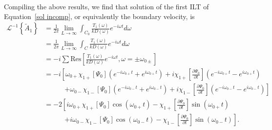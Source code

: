 \documentclass{aastex61}
\begin{document}
Compiling the above results, we find that solution of the first ILT of Equation~\eqref{sol incomp}, or equivalently the boundary velocity, is
\begin{align}
\mathcal{L}^{-1}\left\{ \tilde{A}_1 \right\} &= \frac{1}{2\pi} \lim_{L \to \infty} \int_{C_0} \frac{T_1(\omega)}{kD(\omega)} e^{-i\omega t} d\omega \\
&= \frac{1}{2\pi} \lim_{L \to \infty} \int_{C} \frac{T_1(\omega)}{kD(\omega)} e^{-i\omega t} d\omega \\
&= -i \sum \mathrm{Res}\left[\frac{T_1(\omega)}{kD(\omega)}e^{-i\omega t}, \omega = \pm \omega_{0\pm} \right] \\
&= -i \left[\omega_{0+}\chi_{1+}[\Psi_0] (e^{-i\omega_{0+} t} + e^{i\omega_{0+} t}) + i\chi_{1+}\left[ \frac{\partial \Psi_0}{\partial t} \right] (e^{-i\omega_{0+} t} - e^{i\omega_{0+} t}) \right. \\
& \qquad\quad \left. + \omega_{0-}\chi_{1-}[\Psi_0] (e^{-i\omega_{0-} t} + e^{i\omega_{0-} t}) + i\chi_{1-}\left[ \frac{\partial \Psi_0}{\partial t} \right] (e^{-i\omega_{0-} t} - e^{i\omega_{0-} t})\right] \\
&= -2 \left[ i\omega_{0+}\chi_{1+}[\Psi_0] \cos(\omega_{0+} t) - \chi_{1+}\left[ \frac{\partial \Psi_0}{\partial t} \right] \sin(\omega_{0+} t) \right. \\
& \qquad\quad \left. + i\omega_{0-}\chi_{1-}[\Psi_0] \cos(\omega_{0-} t) - \chi_{1-}\left[ \frac{\partial \Psi_0}{\partial t} \right] \sin(\omega_{0-} t) \right].
\end{align}
\end{document}
